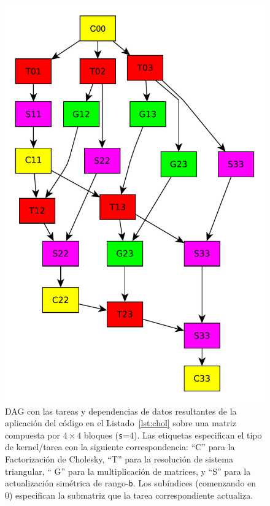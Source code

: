 \begin{figure}%
\begin{center}
\includegraphics[scale=0.35]{Figures/4x4_TaskExample}
\end{center}
	\caption[DAG con las tareas y dependencias de datos resultantes de la aplicación del código en la Figura~\ref{lst:chol}
         sobre una matriz compuesta por $4 \times 4$ bloques ({\tt s}=4).]
	 {DAG con las tareas y dependencias de datos resultantes de la
           aplicación del código en el Listado~\ref{lst:chol} sobre una
           matriz compuesta por $4 \times 4$ bloques ({\tt s}=4). Las
           etiquetas especifican el tipo de kernel/tarea con la siguiente
           correspondencia: ``{\sf C}'' para la Factorización de Cholesky,
           ``{\sf T}'' para la resolución de sistema triangular, ``{\sf
             G}'' para la multiplicación de matrices, y ``{\sf S}'' para la
           actualización simétrica de rango-{\tt b}.  Los subíndices
           (comenzando en 0) especifican la submatriz que la tarea
           correspondiente actualiza.}
\label{fig:dag}
\end{figure}

